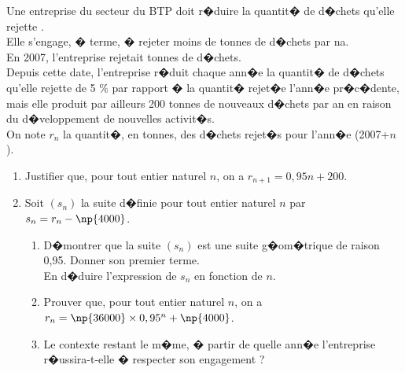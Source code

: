 \documentclass[a4paper,12pt,twoside,french]{extarticle}
\begin{document}
Une entreprise du secteur du BTP doit r�duire la quantit� de d�chets qu'elle rejette .\\
Elle s'engage, � terme, � rejeter moins de  tonnes de d�chets par na.\\
En 2007, l'entreprise rejetait  tonnes de d�chets.\\
Depuis cette date, l'entreprise r�duit chaque ann�e la quantit� de d�chets qu'elle rejette de 5 \%  par rapport � la quantit� rejet�e l'ann�e pr�c�dente, mais elle produit par ailleurs 200 tonnes de nouveaux d�chets par an en raison du d�veloppement de nouvelles activit�s.\\
On note $r_n$ la quantit�, en tonnes, des d�chets rejet�s pour l'ann�e (2007+$n$).
\begin{enumerate}
\item Justifier que, pour tout entier naturel $n$, on  a $r_{n+1}=0,95n+200$.
\item Soit $(s_n)$ la suite d�finie pour tout entier naturel $n$ par $s_n=r_n-\np{4000}$.
\begin{enumerate}
\item D�montrer que la suite $(s_n)$ est une suite g�om�trique de raison 0,95. Donner son premier terme.\\
En d�duire l'expression de $s_n$ en fonction de $n$.
\item Prouver que, pour tout entier naturel $n$, on a $r_n=\np{36000} \times 0,95^n+\np{4000}$.
\item Le contexte restant le m�me, � partir de quelle ann�e l'entreprise r�ussira-t-elle � respecter son engagement ?
\end{enumerate}
\end{enumerate}
\end{document}
